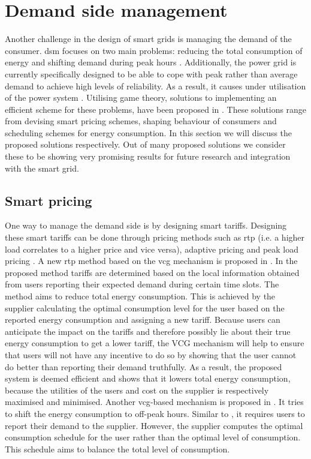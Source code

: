 \section{Demand side management}\label{dsm}
Another challenge in the design of smart grids is managing the demand of the consumer. \ac{dsm} focuses on two main problems: reducing the total consumption of energy and shifting demand during peak hours \cite{keypaper}. Additionally, the power grid is currently specifically designed to be able to cope with peak rather than average demand to achieve high levels of reliability. As a result, it causes under utilisation of the power system \cite{MaDengSongEtAl2014}. Utilising game theory, solutions to implementing an efficient scheme for these problems, have been proposed in \cite{SamadiMohsenian-RadSchoberEtAl2012, SamadiSchoberWong2011, MaDengSongEtAl2014, MaharjanZhuZhangEtAl2013, ChenKishoreSnyder2011, ChenLiLowEtAl2010, Mohsenian-RadWongJatskevichEtAl2010a, SalinasLiLi2013, CaronKesidis2010, DepuruWangDevabhaktuni2011a}. These solutions range from devising smart pricing schemes, shaping behaviour of consumers and scheduling schemes for energy consumption. In this section we will discuss the proposed solutions respectively. Out of many proposed solutions we consider these to be showing very promising results for future research and integration with the smart grid.

\subsection{Smart pricing}
One way to manage the demand side is by designing smart tariffs. Designing these smart tariffs can be done through pricing methods such as \ac{rtp} (i.e. a higher load correlates to a higher price and vice versa), adaptive pricing and peak load pricing \cite{SamadiMohsenian-RadSchoberEtAl2012}. A new \ac{rtp} method based on the \ac{vcg} mechanism is proposed in \cite{SamadiMohsenian-RadSchoberEtAl2012}. In the proposed method tariffs are determined based on the local information obtained from users reporting their expected demand during certain time slots. The method aims to reduce total energy consumption. This is achieved by the supplier calculating the optimal consumption level for the user based on the reported energy consumption and assigning a new tariff. Because users can anticipate the impact on the tariffs and therefore possibly lie about their true energy consumption to get a lower tariff, the VCG mechanism will help to ensure that users will not have any incentive to do so by showing that the user cannot do better than reporting their demand truthfully. As a result, the proposed system is deemed efficient and shows that it lowers total energy consumption, because the utilities of the users and cost on the supplier is respectively maximised and minimised. Another \ac{vcg}-based mechanism is proposed in \cite{SamadiSchoberWong2011}. It tries to shift the energy consumption to off-peak hours. Similar to \cite{SamadiMohsenian-RadSchoberEtAl2012}, it requires users to report their demand to the supplier. However, the supplier computes the optimal consumption schedule for the user rather than the optimal level of consumption. This schedule aims to balance the total level of consumption.

